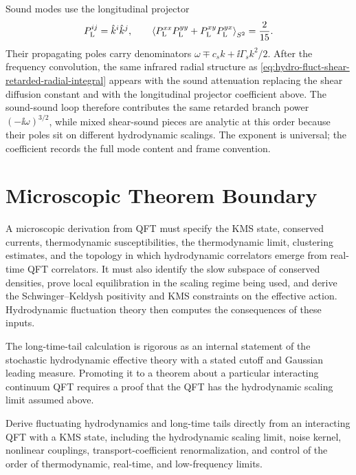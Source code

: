 Sound modes use the longitudinal projector
\[
  P_{\rm L}^{ij}=\hat k^i\hat k^j,
  \qquad
  \left\langle
    P_{\rm L}^{xx}P_{\rm L}^{yy}
    +
    P_{\rm L}^{xy}P_{\rm L}^{yx}
  \right\rangle_{S^2}
  =
  \frac2{15}.
\]
Their propagating poles carry denominators
\(\omega\mp c_s k+\ii\Gamma_s k^2/2\).  After the frequency convolution, the
same infrared radial structure as
\eqref{eq:hydro-fluct-shear-retarded-radial-integral} appears with the sound
attenuation replacing the shear diffusion constant and with the longitudinal
projector coefficient above.  The sound-sound loop therefore contributes the
same retarded branch power \((-\ii\omega)^{3/2}\), while mixed
shear-sound pieces are analytic at this order because their poles sit on
different hydrodynamic scalings.  The exponent is universal; the coefficient
records the full mode content and frame convention.

\section{Microscopic Theorem Boundary}

A microscopic derivation from QFT must specify the KMS state, conserved
currents, thermodynamic susceptibilities, the thermodynamic limit, clustering
estimates, and the topology in which hydrodynamic correlators emerge from
real-time QFT correlators.  It must also identify the slow subspace of
conserved densities, prove local equilibration in the scaling regime being
used, and derive the Schwinger--Keldysh positivity and KMS constraints on
the effective action.  Hydrodynamic fluctuation theory then computes the
consequences of these inputs.

The long-time-tail calculation is rigorous as an internal statement of the
stochastic hydrodynamic effective theory with a stated cutoff and Gaussian
leading measure.  Promoting it to a theorem about a particular interacting
continuum QFT requires a proof that the QFT has the hydrodynamic scaling
limit assumed above.

\begin{openproblem}
\label{op:hydrodynamic-limit-qft}
Derive fluctuating hydrodynamics and long-time tails directly from an
interacting QFT with a KMS state, including the hydrodynamic scaling limit,
noise kernel, nonlinear couplings, transport-coefficient renormalization,
and control of the order of thermodynamic, real-time, and low-frequency
limits.
\end{openproblem}
